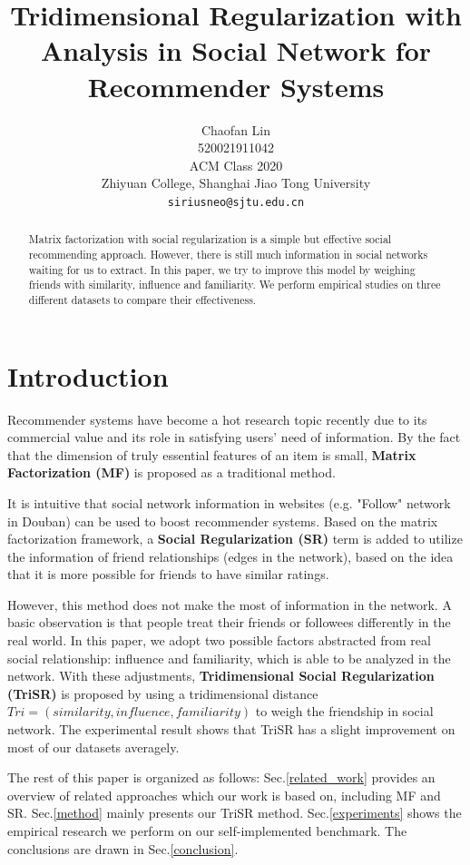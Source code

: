 \documentclass{article}
\title{Tridimensional Regularization with Analysis in Social Network for Recommender Systems}
\author{
  Chaofan Lin \\
    520021911042\\
    ACM Class 2020\\
    Zhiyuan College, Shanghai Jiao Tong University \\
  \texttt{siriusneo@sjtu.edu.cn} \\
}
\begin{document}
\maketitle

\begin{abstract}
  Matrix factorization with social regularization is a simple but effective social 
  recommending approach. However, there is still 
  much information in social networks
  waiting for us to extract.
  In this paper, we try to improve this model 
  by weighing friends with similarity, influence and familiarity.
  We perform empirical studies 
  on three different datasets to compare their effectiveness.
\end{abstract}


\section{Introduction}

Recommender systems have become a hot research topic recently
due to its commercial value and its role in satisfying users'
need of information. By the fact that the dimension of truly essential features of an item is small, 
\textbf{Matrix Factorization (MF)} \cite{ko2009mf} is proposed as a traditional method.

It is intuitive that 
social network information in websites (e.g. "Follow" network in Douban) 
can be used to boost recommender systems. Based on the matrix factorization framework, 
a \textbf{Social Regularization (SR)} \cite{ma2011rsr} term is added to utilize the information of friend relationships 
(edges in the network), based on the idea that it is more possible for friends to 
have similar ratings.

However, this method does not make 
the most of information in the network. A basic observation is that people treat 
their friends or followees differently in the real world.
In this paper, we adopt two possible factors abstracted from real social relationship:
influence and familiarity, which is able to be analyzed in the network. 
With these adjustments, \textbf{Tridimensional Social Regularization (TriSR)} 
is proposed by using a tridimensional distance 
$Tri = (similarity, influence, familiarity)$ 
to weigh the friendship in social network. The experimental result shows
that TriSR has a slight improvement on most of our datasets averagely.

The rest of this paper is organized as follows: 
Sec.\ref{related_work} 
provides an overview of related approaches which our work is based on, including MF and SR.
Sec.\ref{method} mainly presents our TriSR method. 
Sec.\ref{experiments} shows the empirical research we perform on our 
self-implemented benchmark. The conclusions are drawn in Sec.\ref{conclusion}. 
\end{document}
